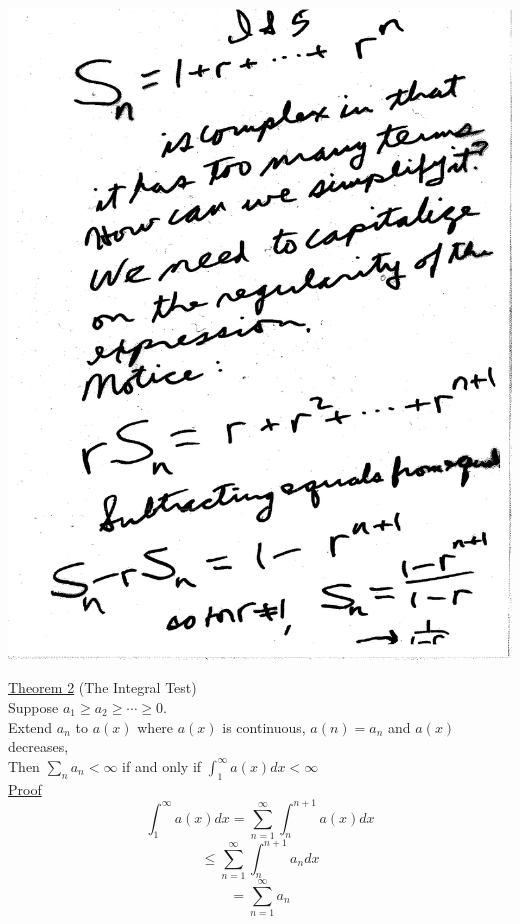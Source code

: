 \documentclass[10pt,a4paper]{article}
\begin{document}
\includegraphics[scale=.5]{Pages/IS_5}




\normalsize

\newpage

\noindent \underline{Theorem 2} (The Integral Test)
\vspace{5mm}
\\ Suppose $a_1 \geq a_2 \geq \cdots \geq 0$.
\\ Extend $a_n$ to $a(x)$ where $a(x)$ is continuous,
$a(n) = a_n$ and $a(x)$ decreases,
\\ Then $\sum_n a_n < \infty$ if and only if $\int_{1}^{\infty} a(x) dx < \infty$
\vspace{5mm}
\\ \underline{Proof}
$$\int_{1}^{\infty} a(x) dx = \sum_{n=1}^{\infty} \int_{n}^{n+1} a(x) dx$$
$$ \leq \sum_{n=1}^{\infty} \int_{n}^{n+1} a_n dx$$
$$ = \sum_{n=1}^{\infty} a_n $$
\end{document}
